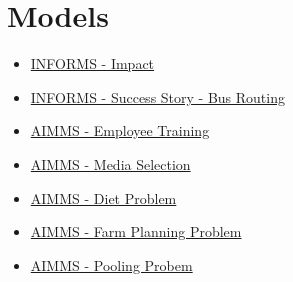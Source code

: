 \documentclass[../open-optimization/open-optimization.tex]{subfiles}
\begin{document}
\section{Models}


\begin{itemize}
\item \href{https://www.informs.org/Impact}{INFORMS - Impact}
\item \href{https://www.informs.org/Impact/O.R.-Analytics-Success-Stories/Optimized-school-bus-routing-helps-school-districts-design-better-policies}{INFORMS - Success Story - Bus Routing}
\item \href{https://download.aimms.com/aimms/download/manuals/AIMMS3OM_EmployeeTraining.pdf}{AIMMS - Employee Training}

\item \href{https://download.aimms.com/aimms/download/manuals/AIMMS3OM_MediaSelection.pdf}{AIMMS - Media Selection}

\item \href{https://download.aimms.com/aimms/download/manuals/AIMMS3OM_Diet.pdf}{AIMMS - Diet Problem}

\item \href{https://download.aimms.com/aimms/download/manuals/AIMMS3OM_FarmPlanning.pdf}{AIMMS - Farm Planning Problem}

\item \href{https://download.aimms.com/aimms/download/manuals/AIMMS3OM_Pooling.pdf}{AIMMS - Pooling Probem}
\end{itemize}
\end{document}
